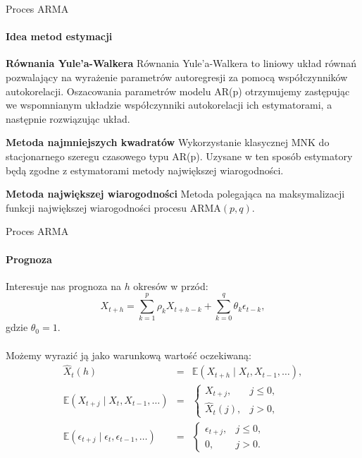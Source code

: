 \documentclass[a4paper, 11pt]{beamer}
\begin{document}
	\begin{frame}{Proces ARMA}
		\framesubtitle{Idea metod estymacji}
		\begin{block}{\textbf{Równania Yule'a-Walkera}}
			Równania Yule'a-Walkera to liniowy układ równań pozwalający na wyrażenie
			parametrów autoregresji za pomocą współczynników autokorelacji. Oszacowania
			parametrów modelu AR(p) otrzymujemy zastępując we wspomnianym układzie
			współczynniki autokorelacji ich estymatorami, a następnie rozwiązując układ.
		\end{block}
		\begin{block}{\textbf{Metoda najmniejszych kwadratów}}
			Wykorzystanie klasycznej MNK do stacjonarnego szeregu czasowego typu AR(p).
			Uzysane w ten sposób estymatory będą zgodne z estymatorami metody największej
			wiarogodności.
		\end{block}
		\begin{block}{\textbf{Metoda największej wiarogodności}}
			Metoda polegająca na maksymalizacji funkcji największej wiarogodności procesu
			$\mbox{ARMA}\left(p,q\right).$
		\end{block}
	\end{frame}
	
	\begin{frame}{Proces ARMA}
		\framesubtitle{Prognoza}
		Interesuje nas prognoza na $h$ okresów w przód: \[
			X_{t+h} = \sum_{k=1}^{p} \rho_{k} X_{t+h-k} + \sum_{k=0}^{q} \theta_{k} \epsilon_{t-k},
		\] gdzie $\theta_0 = 1.$
		\\~\\
		Możemy wyrazić ją jako warunkową wartość oczekiwaną: \begin{eqnarray*}
			\hat{X}_t\left(h\right) & = & \mathbb{E}\left(X_{t+h} \mid X_t, X_{t-1}, \ldots\right),\\
			\mathbb{E}\left(X_{t+j} \mid X_t, X_{t-1}, \ldots\right) & = & \begin{cases}
				X_{t+j}, & j \leq 0,\\
				\hat{X}_t\left(j\right), & j > 0,
			\end{cases}\\
			\mathbb{E}\left(\epsilon_{t+j} \mid \epsilon_t, \epsilon_{t-1}, \ldots\right) & = & \begin{cases}
				\epsilon_{t+j}, & j \leq 0,\\
				0, & j > 0.
			\end{cases}
		\end{eqnarray*}
	\end{frame}
	
\end{document}
